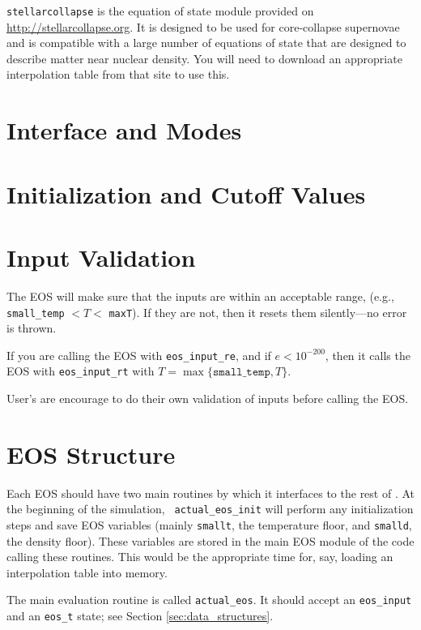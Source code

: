 {\tt stellarcollapse} is the equation of state module provided
  on \url{http://stellarcollapse.org}. It is designed
  to be used for core-collapse supernovae and is compatible with a
  large number of equations of state that are designed to describe
  matter near nuclear density. You will need to download an
  appropriate interpolation table from that site to use this.


\section{Interface and Modes}

\section{Initialization and Cutoff Values}


\section{Input Validation}

The EOS will make sure that the inputs are within an acceptable range,
(e.g., {\tt small\_temp} $< T <$ {\tt maxT}).  If they are not, then it
resets them silently---no error is thrown.

If you are calling the EOS with {\tt eos\_input\_re}, and if $e <
10^{-200}$, then it calls the EOS with {\tt eos\_input\_rt} with $T =
\max\{ \mathtt{small\_temp}, T \}$.

User's are encourage to do their own validation of inputs before calling
the EOS.


\section{EOS Structure}

Each EOS should have two main routines by which it interfaces to the
rest of \castro.  At the beginning of the simulation, {\tt
  actual\_eos\_init} will perform any initialization steps and save
EOS variables (mainly \texttt{smallt}, the temperature floor, and
\texttt{smalld}, the density floor). These variables are stored in the
main EOS module of the code calling these routines. This would be the
appropriate time for, say, loading an interpolation table into memory.

The main evaluation routine is called {\tt actual\_eos}. It should
accept an {\tt eos\_input} and an {\tt eos\_t} state; see Section
\ref{sec:data_structures}.

